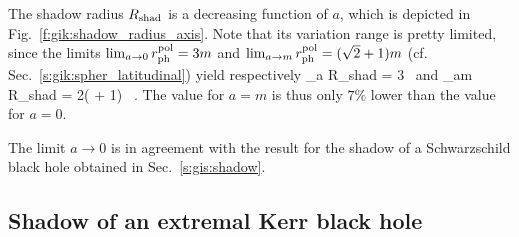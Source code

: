 The shadow radius
$R_{\rm shad}$ is a decreasing function of $a$, which is depicted in Fig.~\ref{f:gik:shadow_radius_axis}.
Note that its variation range is pretty limited, since the limits
$\lim_{a\to 0} r_{\rm ph}^{\rm pol} = 3 m$ and $\lim_{a\to m} r_{\rm ph}^{\rm pol} = (\sqrt{2} + 1) m$
(cf. Sec.~\ref{s:gik:spher_latitudinal})
yield respectively
\be
    \lim_{a} R_{\rm shad} = 3   \, 
    \quad\mbox{and}\quad
    \lim_{a\to m} R_{\rm shad} =  2( + 1) 
     \,   .
\ee
The value for $a= m$ is thus only $7\%$ lower than the value for $a= 0$.

\begin{remark}
The limit $a\to 0$ is in agreement with the result for the shadow of a
Schwarzschild black hole obtained in Sec.~\ref{s:gis:shadow}.
\end{remark}


\subsection{Shadow of an extremal Kerr black hole} \label{s:gik:shadow_extremal}

